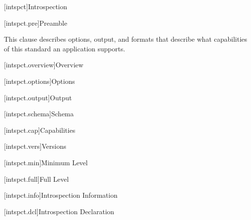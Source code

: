 
[intspct]{Introspection}

[intspct.pre]{Preamble}

\pnum
This clause describes options, output, and formats that describe what
capabilities of this standard an application supports.

[intspct.overview]{Overview}

[intspct.options]{Options}

[intspct.output]{Output}

[intspct.schema]{Schema}

[intspct.cap]{Capabilities}

[intspct.vers]{Versions}

[intspct.min]{Minimum Level}

[intspct.full]{Full Level}

[intspct.info]{Introspection Information}

[intspct.dcl]{Introspection Declaration}
